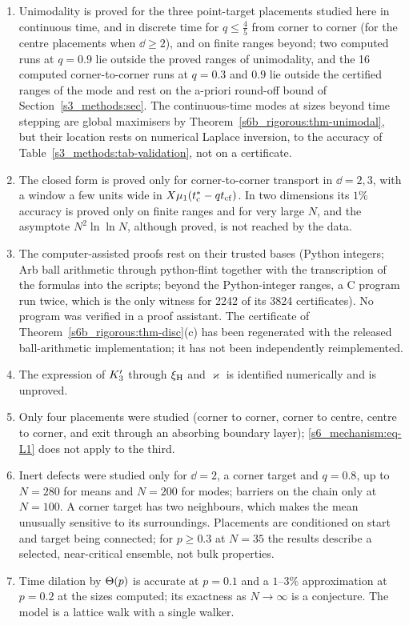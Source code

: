 \begin{enumerate}
\item Unimodality is proved for the three point-target placements studied here in continuous time, and in discrete
time for $q\le\frac45$ from corner to corner (for the centre placements when $\dd\ge2$), and on finite ranges beyond;
two computed runs at $q=0.9$ lie outside the proved ranges of unimodality, and the 16 computed corner-to-corner runs at
$q=0.3$ and $0.9$ lie outside the certified ranges of the mode and rest on the a-priori round-off bound of
Section~\ref{s3_methods:sec}. The
continuous-time modes at sizes beyond time stepping are global maximisers by Theorem~\ref{s6b_rigorous:thm-unimodal}, but
their location rests on numerical Laplace inversion, to the accuracy of Table~\ref{s3_methods:tab-validation}, not on a
certificate.
\item The closed form is proved only for corner-to-corner transport in $\dd=2,3$, with a window a few units wide in
$X\mu_{1}(t^{*}_{\mathrm{c}}-qt_{\mathrm{cf}})$. In two dimensions its $1\%$ accuracy is proved only on finite ranges and for very large $N$, and
the asymptote $N^{2}\ln\ln N$, although proved, is not reached by the data.
\item The computer-assisted proofs rest on their trusted bases (Python integers; Arb ball arithmetic through
python-flint together with the transcription of the formulas into the scripts; beyond the Python-integer ranges, a C
program run twice, which is the only witness for 2242 of its 3824 certificates). No program was verified in a proof
assistant. The certificate of Theorem~\ref{s6b_rigorous:thm-disc}(c) has been regenerated with the released ball-arithmetic implementation; it has not been independently reimplemented.
\item The expression of $K_{3}'$ through $\xi_{\mathrm{H}}$ and $\varkappa$ is identified numerically and is unproved.
\item Only four placements were studied (corner to corner, corner to centre, centre to corner, and exit through an
absorbing boundary layer); \eqref{s6_mechanism:eq-L1} does not apply to the third.
\item Inert defects were studied only for $\dd=2$, a corner target and $q=0.8$, up to $N=280$ for means and $N=200$ for
modes; barriers on the chain only at $N=100$. A corner target has two neighbours, which makes the mean unusually
sensitive to its surroundings. Placements are conditioned on start and target being connected; for $p\ge0.3$ at $N=35$
the results describe a selected, near-critical ensemble, not bulk properties.
\item Time dilation by $\Theta(p)$ is accurate at $p=0.1$ and a $1$--$3\%$ approximation at $p=0.2$ at the sizes computed;
its exactness as $N\to\infty$ is a conjecture. The model is a lattice walk with a single walker.
\end{enumerate}

